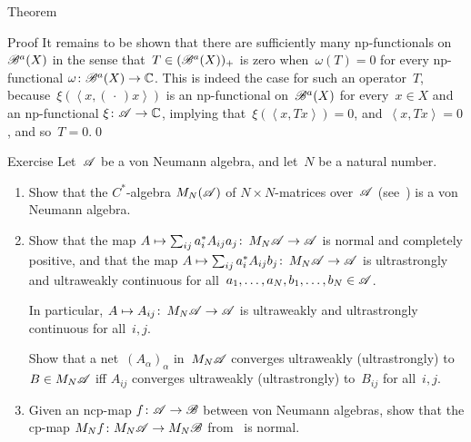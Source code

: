 \documentclass[a]{subfiles}
\begin{document}
\begin{parsec}
\begin{point}[bah-vn]{Theorem}
\begin{point}{Proof}
It remains to be shown that
there are sufficiently many np-functionals on $\mathscr{B}^a(X)$
in the sense that~$T\in(\mathscr{B}^a(X))_+$ is zero
when~$\omega(T)=0$ for every np-functional $\omega\colon \mathscr{B}^a(X)\to\mathbb{C}$.
This is indeed
the case for such an operator~$T$,
because~$\xi(\left<x,(\,\cdot\,)x\right>)$
is an np-functional on~$\mathscr{B}^a(X)$
for every~$x\in X$
and an np-functional $\xi\colon \mathscr{A}\to\mathbb{C}$,
implying that~$\xi(\left<x,Tx\right>)=0$,
and~$\left<x,Tx\right>=0$,
and so~$T=0$.\qed
\end{point}
\end{point}
\begin{point}[mn-vna]{Exercise}%
Let~$\mathscr{A}$ be a von Neumann algebra,
and let~$N$ be a natural number.
\begin{enumerate}
\item
Show 
that the $C^*$-algebra
$M_N(\mathscr{A})$ of $N\times N$-matrices over~$\mathscr{A}$ (see~)
is a von Neumann algebra.
\item
Show that
the map $A\mapsto \sum_{ij} a_i^* A_{ij} a_j\colon\, M_N\mathscr{A}\to \mathscr{A}$
is normal and completely positive,
and that
the map $A\mapsto \sum_{ij} a_i^* A_{ij} b_j\colon\, M_N\mathscr{A}\to\mathscr{A}$
is ultrastrongly and ultraweakly continuous
for all~$a_1,\dotsc,a_N,b_1,\dotsc,b_N\in\mathscr{A}$.

In particular, $A\mapsto A_{ij}\colon\,M_N\mathscr{A}\to\mathscr{A}$
is ultraweakly and ultrastrongly continuous
for all~$i,j$.

Show that a net~$(A_\alpha)_\alpha$
in~$M_N\mathscr{A}$
converges ultraweakly (ultrastrongly)
to $B\in M_N\mathscr{A}$
iff $A_{ij}$ converges ultraweakly (ultrastrongly)
to~$B_{ij}$ for all~$i,j$.
\item
Given an ncp-map $f\colon \mathscr{A}\to\mathscr{B}$
between von Neumann algebras,
show that the cp-map $M_N f\colon M_N\mathscr{A}\to M_N\mathscr{B}$
from~ is normal.
\end{enumerate}
\end{point}
\end{parsec}
\end{document}

